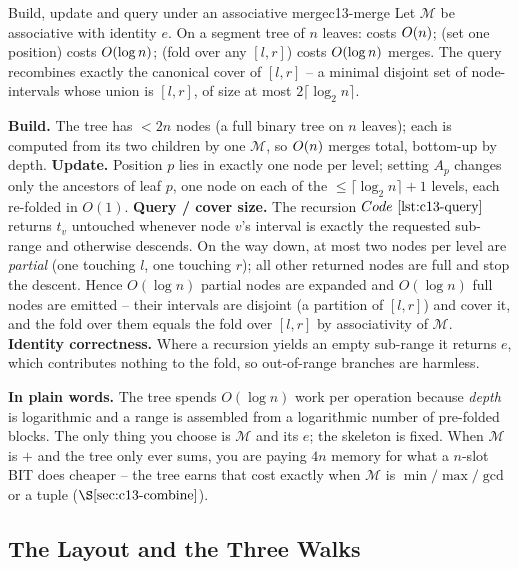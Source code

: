 \begin{theorem}{Build, update and query under an associative merge}{c13-merge}
Let \(\mathcal{M}\) be associative with identity \(e\).  On a segment tree of
\(n\) leaves:  costs \(O(n)\);  (set one
position) costs \(O(\log n)\);  (fold over any \([l,r]\))
costs \(O(\log n)\) merges.  The query recombines exactly the canonical
cover of \([l,r]\) -- a minimal disjoint set of node-intervals whose union is
\([l,r]\), of size at most \(2\lceil\log_2 n\rceil\).
\end{theorem}
\begin{proofbox}
\textbf{Build.} The tree has \(<2n\) nodes (a full binary tree on \(n\) leaves);
each is computed from its two children by one \(\mathcal{M}\), so
\(O(n)\) merges total, bottom-up by depth.
\textbf{Update.} Position \(p\) lies in exactly one node per level; setting
\(A_p\) changes only the ancestors of leaf \(p\), one node on each of the
\(\le\lceil\log_2 n\rceil+1\) levels, each re-folded in \(O(1)\).
\textbf{Query / cover size.} The recursion \(\coderef{c13-query}\) returns
\(t_v\) untouched whenever node \(v\)'s interval is exactly the requested
sub-range and otherwise descends.  On the way down, at most two nodes per level
are \emph{partial} (one touching \(l\), one touching \(r\)); all other returned
nodes are full and stop the descent.  Hence \(O(\log n)\) partial nodes are
expanded and \(O(\log n)\) full nodes are emitted -- their intervals are
disjoint (a partition of \([l,r]\)) and cover it, and the fold over them
equals the fold over \([l,r]\) by associativity of \(\mathcal{M}\).
\textbf{Identity correctness.} Where a recursion yields an empty sub-range it
returns \(e\), which contributes nothing to the fold, so out-of-range branches
are harmless.
\end{proofbox}

\noindent\textbf{In plain words.}  The tree spends \(O(\log n)\) work per
operation because \emph{depth} is logarithmic and a range is assembled from a
logarithmic number of pre-folded blocks.  The only thing you choose is
\(\mathcal{M}\) and its \(e\); the skeleton is fixed.  When \(\mathcal{M}\) is
\(+\) and the tree only ever sums, you are paying \(4n\) memory for what a
\(n\)-slot BIT does cheaper -- the tree earns that cost exactly when
\(\mathcal{M}\) is \(\min/\max/\gcd\) or a tuple (\(\secref{c13-combine}\)).

\subsection{The Layout and the Three Walks}

